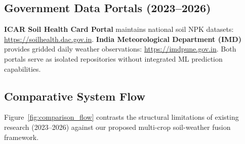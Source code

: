 \documentclass[11pt,a4paper]{article}
\begin{document}
\subsection{Government Data Portals (2023--2026)}
\textbf{ICAR Soil Health Card Portal} \cite{soilhealthportal} maintains national soil NPK datasets: \url{https://soilhealth.dac.gov.in}. \textbf{India Meteorological Department (IMD)} \cite{imdclimate} provides gridded daily weather observations: \url{https://imdpune.gov.in}. Both portals serve as isolated repositories without integrated ML prediction capabilities.

\subsection{Comparative System Flow}
Figure~\ref{fig:comparison_flow} contrasts the structural limitations of existing research (2023--2026) against our proposed multi-crop soil-weather fusion framework.
\end{document}
